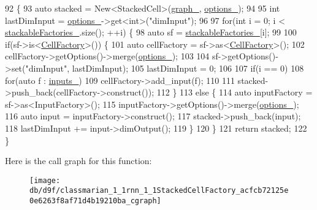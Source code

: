 \begin{DoxyCode}
92                         \{
93     \textcolor{keyword}{auto} stacked = New<StackedCell>(\hyperlink{classmarian_1_1Factory_aa23d3b5d72140912b8666a97f5cf10e5}{graph\_}, \hyperlink{classmarian_1_1Factory_a9bb7f7a432f482665443b33a38cb433a}{options\_});
94 
95     \textcolor{keywordtype}{int} lastDimInput = \hyperlink{classmarian_1_1Factory_a9bb7f7a432f482665443b33a38cb433a}{options\_}->get<\textcolor{keywordtype}{int}>(\textcolor{stringliteral}{"dimInput"});
96 
97     \textcolor{keywordflow}{for}(\textcolor{keywordtype}{int} i = 0; i < \hyperlink{classmarian_1_1rnn_1_1StackedCellFactory_aadc7012abbf4a2e55d8d9415562dab10}{stackableFactories\_}.size(); ++i) \{
98       \textcolor{keyword}{auto} sf = \hyperlink{classmarian_1_1rnn_1_1StackedCellFactory_aadc7012abbf4a2e55d8d9415562dab10}{stackableFactories\_}[i];
99 
100       \textcolor{keywordflow}{if}(sf->is<\hyperlink{classmarian_1_1rnn_1_1CellFactory_a8bc10b58aae39754e29d6793d29889f2}{CellFactory}>()) \{
101         \textcolor{keyword}{auto} cellFactory = sf->as<\hyperlink{classmarian_1_1rnn_1_1CellFactory_a8bc10b58aae39754e29d6793d29889f2}{CellFactory}>();
102         cellFactory->getOptions()->merge(\hyperlink{classmarian_1_1Factory_a9bb7f7a432f482665443b33a38cb433a}{options\_});
103 
104         sf->getOptions()->set(\textcolor{stringliteral}{"dimInput"}, lastDimInput);
105         lastDimInput = 0;
106 
107         \textcolor{keywordflow}{if}(i == 0)
108           \textcolor{keywordflow}{for}(\textcolor{keyword}{auto} f : \hyperlink{classmarian_1_1rnn_1_1CellFactory_a1a1309730b71955d9e6a14189a295e21}{inputs\_})
109             cellFactory->add\_input(f);
110 
111         stacked->push\_back(cellFactory->construct());
112       \}
113       \textcolor{keywordflow}{else} \{
114         \textcolor{keyword}{auto} inputFactory = sf->as<InputFactory>();
115         inputFactory->getOptions()->merge(\hyperlink{classmarian_1_1Factory_a9bb7f7a432f482665443b33a38cb433a}{options\_});
116         \textcolor{keyword}{auto} input = inputFactory->construct();
117         stacked->push\_back(input);
118         lastDimInput += input->dimOutput();
119       \}
120     \}
121     \textcolor{keywordflow}{return} stacked;
122   \}
\end{DoxyCode}


Here is the call graph for this function\+:
\nopagebreak
\begin{figure}[H]
\begin{center}
\leavevmode
\texttt{[image: db/d9f/classmarian\_1\_1rnn\_1\_1StackedCellFactory\_acfcb72125e0e6263f8af71d4b19210ba\_cgraph]}
\end{center}
\end{figure}


